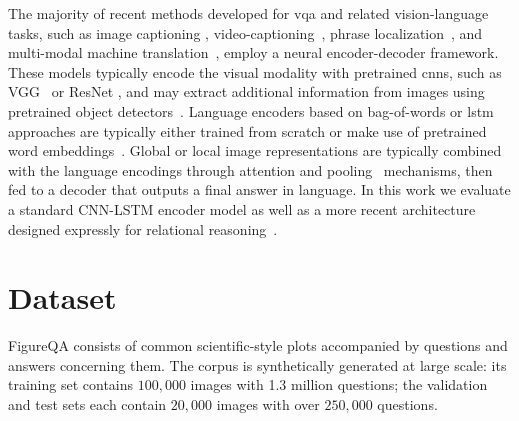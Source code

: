 \documentclass{article} %
\begin{document}
The majority of recent methods developed for \gls{vqa} and related vision-language tasks, such as image captioning 
\citep{xu2015show, fang2015captions}, video-captioning~\citep{yu2016video}, phrase localization~\citep{hu2016natural}, 
and multi-modal machine translation~\citep{elliott2017imagination}, employ a neural
encoder-decoder framework. These models typically encode the visual modality with 
pretrained \glspl{cnn}, such as VGG~\citep{simonyan2014very} or ResNet
\citep{he2016deep}, and may extract additional information from images 
using pretrained object detectors~\citep{ren15fasterrcnn}. Language encoders
based on bag-of-words or \gls{lstm} approaches are typically either trained from scratch
\citep{elliott2017imagination} or make use of pretrained word embeddings~\citep{you2016image}.
Global or local image representations are typically combined with the language encodings through attention
\citep{xiong2016dynamic, yang2016stacked, lu2016hierarchical} and pooling~\citep{fukui2016multimodal} mechanisms,
then fed to a decoder that outputs a final answer in language.
In this work we evaluate a standard CNN-LSTM encoder model as well as a more recent architecture designed expressly for relational reasoning~\citep{santoro2017simple}.

\section{Dataset}
\label{sec:dataset}
FigureQA consists of common scientific-style plots accompanied by questions and answers concerning them. The corpus is synthetically generated at large scale: its training set contains $100,000$ images with 1.3 million questions; the validation and test sets each contain $20,000$ images with over $250,000$ questions.
\end{document}
